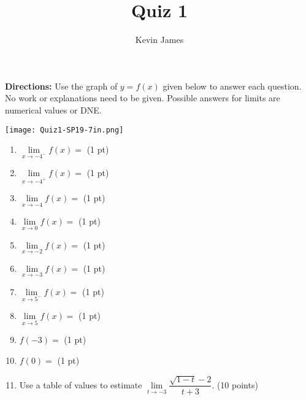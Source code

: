 \documentclass[handout,nooutcomes,noauthor,addpoints]{Ximera}
\author{Kevin James}
\title{Quiz 1}
\begin{document}
	\begin{abstract}
	\end{abstract}
	\maketitle
	\textbf{Directions:}  Use the graph of $ y=f(x) $ given below to answer each question.  No work or explanations need to be given.  Possible answers for limits are numerical values or DNE.
	\begin{image}
		\texttt{[image: Quiz1-SP19-7in.png]}
		\vspace{.5cm}
	\end{image}
	\begin{enumerate}[label=\arabic*]
		\item $ \lim\limits_{x \to -4^-}f(x) = $ \hrulefill (1 pt)
		\item $ \lim\limits_{x \to -4^+}f(x) = $ \hrulefill (1 pt)
		\item $ \lim\limits_{x \to -4}f(x) = $ \hrulefill (1 pt)
		\item $ \lim\limits_{x \to 0}f(x) = $ \hrulefill (1 pt)
		\item $ \lim\limits_{x \to -2}f(x) = $ \hrulefill (1 pt)
		\item $ \lim\limits_{x \to -3}f(x) = $ \hrulefill (1 pt)
		\item $ \lim\limits_{x \to 5^-}f(x) = $ \hrulefill (1 pt)
		\item $ \lim\limits_{x \to 5}f(x) = $ \hrulefill (1 pt)
		\item $ f(-3) = $ \hrulefill (1 pt)
		\item $ f(0)= $ \hrulefill (1 pt)
		
		\clearpage
		
		\item Use a table of values to estimate $ \lim\limits_{t \to -3}\dfrac{\sqrt{1-t}-2}{t+3} $.  (10 points)
	\end{enumerate}
\end{document}
